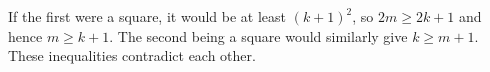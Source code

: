 If the first were a square, it would be at least $(k+1)^2$, so $2m\ge2k+1$ and hence $m\ge k+1$. The second being a square would similarly give $k\ge m+1$. These inequalities contradict each other.
